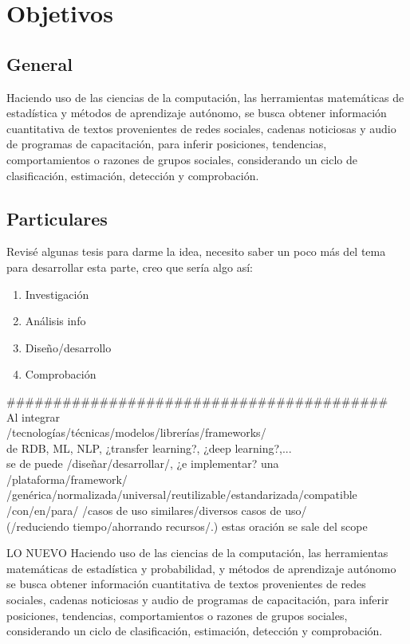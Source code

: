 \section {Objetivos}\label{sec:objetivos}
\subsection {General}
Haciendo uso de las ciencias de la computación, las herramientas matemáticas de estadística y métodos de aprendizaje autónomo, se busca obtener información cuantitativa de textos provenientes de redes sociales, cadenas noticiosas y audio de programas de capacitación, para inferir posiciones, tendencias, comportamientos o razones de grupos sociales, considerando un ciclo de clasificación, estimación, detección y comprobación.
\subsection {Particulares}
Revisé algunas tesis para darme la idea, necesito saber un poco más del tema para desarrollar esta parte, creo que sería algo así:
\begin{enumerate}
    \item Investigación
    \item Análisis info
    \item Diseño/desarrollo
    \item Comprobación
\end{enumerate}

\#\#\#\#\#\#\#\#\#\#\#\#\#\#\#\#\#\#\#\#\#\#\#\#\#\#\#\#\#\#\#\#\#\#\#\#\#\#\#\#\#\\

Al integrar\\
/tecnologías/técnicas/modelos/librerías/frameworks/\\
de RDB, ML, NLP, ¿transfer learning?, ¿deep learning?,...\\
se de puede /diseñar/desarrollar/, ¿e implementar? una\\
/plataforma/framework/\\
/genérica/normalizada/universal/reutilizable/estandarizada/compatible\\
/con/en/para/ /casos de uso similares/diversos casos de uso/\\
(/reduciendo tiempo/ahorrando recursos/.) estas oración se sale del scope

LO NUEVO
Haciendo uso de las ciencias de la computación, las herramientas matemáticas de estadística y probabilidad, y métodos de aprendizaje autónomo se busca obtener información cuantitativa de textos provenientes de redes sociales, cadenas noticiosas y audio de programas de capacitación, para inferir posiciones, tendencias, comportamientos o razones de grupos sociales, considerando un ciclo de clasificación, estimación, detección y comprobación.

